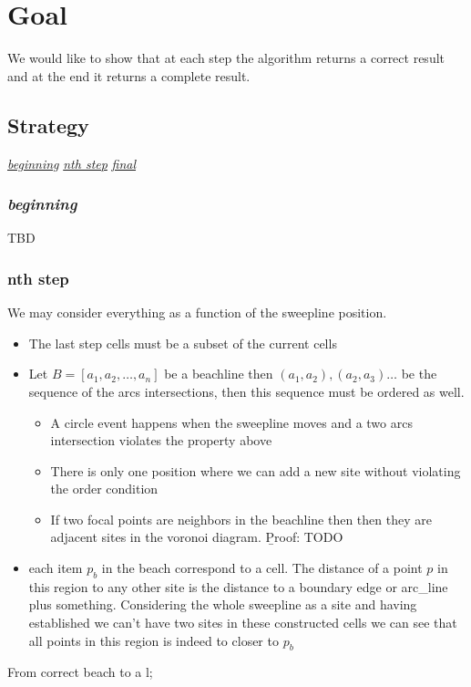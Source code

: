 \documentclass{article}
\begin{document}
\section{Goal}
We would like to show that at each step the algorithm returns a correct result and at the end it returns a complete result.
\subsection{Strategy}
\underline{{\color{gray} \textit{beginning}}} \underline{ {\color{blue} \textit{nth step}}} \underline{{\color{black} \textit{ final}}}

\subsubsection{{\color{gray} \textit{beginning}}}
TBD
\subsubsection{{\color{blue} nth step}}
We may consider everything as a function of the sweepline position. 
\begin{itemize}
    \item The last step cells must be a subset of the current cells
    \item Let $B = \left[a_1, a_2, \dots, a_n \right]$ be a beachline then $\left(a_1, a_2\right), \left(a_2, a_3\right) \dots$ be the sequence of the arcs intersections, then this sequence must be ordered as well.
    \begin{itemize}
        \item A circle event happens when the sweepline moves and a two arcs intersection violates the property above
        \item There is only one position where we can add a new site without violating the order condition   
        \item If two focal points are neighbors in the beachline then then they are adjacent sites in the voronoi diagram.
        {\b Proof}: TODO 
        
        
    \end{itemize}
    \item each item $p_b$ in the beach correspond to a cell. The distance of a point $p$ in this region to any other site is the distance to a boundary edge or arc\_line plus something. Considering the whole sweepline as a site and having established we can't have two sites in these constructed cells we can see that all points in this region is indeed to closer to $p_b$
\end{itemize}
From correct beach to a l; 
\end{document}
